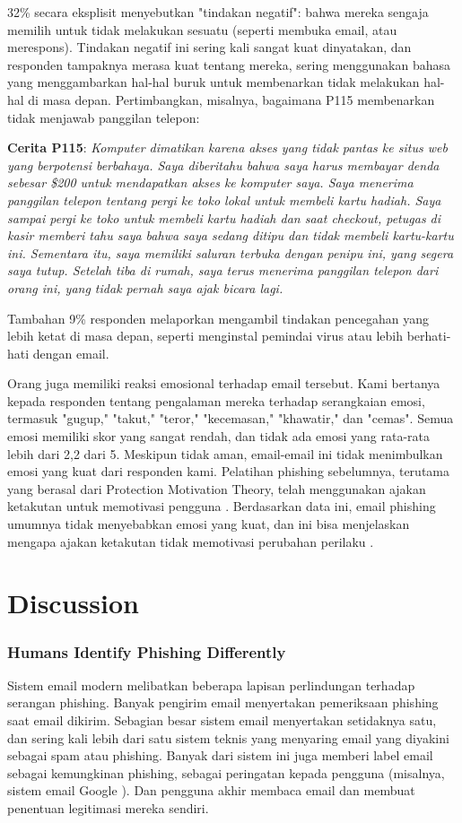\documentclass[lettersize,journal]{IEEEtran}
\begin{document}
32\% secara eksplisit menyebutkan "tindakan negatif": bahwa mereka
sengaja memilih untuk tidak melakukan sesuatu (seperti membuka email,
atau merespons). Tindakan negatif ini sering kali sangat kuat
dinyatakan, dan responden tampaknya merasa kuat tentang mereka,
sering menggunakan bahasa yang menggambarkan hal-hal buruk untuk membenarkan tidak melakukan
hal-hal di masa depan. Pertimbangkan, misalnya, bagaimana P115 membenarkan
tidak menjawab panggilan telepon:

\textbf{Cerita P115}: \textit{Komputer dimatikan karena akses yang tidak pantas ke situs web yang berpotensi berbahaya. Saya diberitahu bahwa saya harus membayar denda sebesar \$200 untuk mendapatkan akses ke komputer saya. Saya menerima panggilan telepon tentang pergi ke toko lokal untuk membeli kartu hadiah. Saya sampai pergi ke toko untuk membeli kartu hadiah dan saat checkout, petugas di kasir memberi tahu saya bahwa saya sedang ditipu dan tidak membeli kartu-kartu ini. Sementara itu, saya memiliki saluran terbuka dengan penipu ini, yang segera saya tutup. Setelah tiba di rumah, saya terus menerima panggilan telepon dari orang ini, yang tidak pernah saya ajak bicara lagi.}

Tambahan 9\% responden melaporkan mengambil tindakan pencegahan yang lebih
ketat di masa depan, seperti menginstal pemindai virus atau lebih berhati-hati
dengan email.

Orang juga memiliki reaksi emosional terhadap email tersebut. Kami bertanya
kepada responden tentang pengalaman mereka terhadap serangkaian emosi, termasuk
"gugup," "takut," "teror," "kecemasan," "khawatir," dan "cemas". Semua emosi
memiliki skor yang sangat rendah, dan tidak ada emosi yang rata-rata lebih dari
2,2 dari 5. Meskipun tidak aman, email-email ini tidak menimbulkan emosi yang
kuat dari responden kami. Pelatihan phishing sebelumnya, terutama yang berasal
dari Protection Motivation Theory, telah menggunakan ajakan ketakutan untuk
memotivasi pengguna \cite{lima,duanol}. Berdasarkan data ini, email phishing
umumnya tidak menyebabkan emosi yang kuat, dan ini bisa menjelaskan mengapa
ajakan ketakutan tidak memotivasi perubahan perilaku \cite{enam}.

\section{Discussion}

\subsubsection{Humans Identify Phishing Differently}
Sistem email modern melibatkan beberapa lapisan perlindungan terhadap serangan
phishing. Banyak pengirim email menyertakan pemeriksaan phishing saat email
dikirim. Sebagian besar sistem email menyertakan setidaknya satu, dan sering
kali lebih dari satu sistem teknis yang menyaring email yang diyakini sebagai
spam atau phishing. Banyak dari sistem ini juga memberi label email sebagai
kemungkinan phishing, sebagai peringatan kepada pengguna (misalnya, sistem
email Google \cite{dualima}). Dan pengguna akhir membaca email dan membuat
penentuan legitimasi mereka sendiri.
\end{document}
